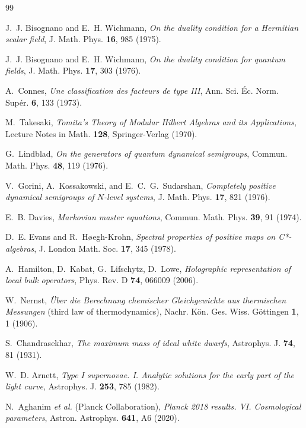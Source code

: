 \documentclass[12pt,a4paper]{article}
\begin{document}
\begin{thebibliography}{99}

J.~J. Bisognano and E.~H. Wichmann,
\textit{On the duality condition for a Hermitian scalar field},
J. Math. Phys. \textbf{16}, 985 (1975).

J.~J. Bisognano and E.~H. Wichmann,
\textit{On the duality condition for quantum fields},
J. Math. Phys. \textbf{17}, 303 (1976).

A.~Connes,
\textit{Une classification des facteurs de type III},
Ann. Sci. \'Ec. Norm. Sup\'er. \textbf{6}, 133 (1973).

M.~Takesaki,
\textit{Tomita's Theory of Modular Hilbert Algebras and its Applications},
Lecture Notes in Math. \textbf{128}, Springer-Verlag (1970).

G.~Lindblad,
\textit{On the generators of quantum dynamical semigroups},
Commun. Math. Phys. \textbf{48}, 119 (1976).

V.~Gorini, A.~Kossakowski, and E.~C.~G.~Sudarshan,
\textit{Completely positive dynamical semigroups of $N$-level systems},
J. Math. Phys. \textbf{17}, 821 (1976).

E.~B. Davies,
\textit{Markovian master equations},
Commun. Math. Phys. \textbf{39}, 91 (1974).

D.~E. Evans and R.~H{\o}egh-Krohn,
\textit{Spectral properties of positive maps on C*-algebras},
J. London Math. Soc. \textbf{17}, 345 (1978).

A.~Hamilton, D.~Kabat, G.~Lifschytz, D.~Lowe,
\textit{Holographic representation of local bulk operators},
Phys. Rev. D \textbf{74}, 066009 (2006).

W.~Nernst,
\textit{\"Uber die Berechnung chemischer Gleichgewichte aus thermischen Messungen}
(third law of thermodynamics),
Nachr. K\"on. Ges. Wiss. G\"ottingen \textbf{1}, 1 (1906).

S.~Chandrasekhar,
\textit{The maximum mass of ideal white dwarfs},
Astrophys. J. \textbf{74}, 81 (1931).

W.~D. Arnett,
\textit{Type I supernovae. I. Analytic solutions for the early part of the light curve},
Astrophys. J. \textbf{253}, 785 (1982).

N.~Aghanim \emph{et al.} (Planck Collaboration),
\textit{Planck 2018 results. VI. Cosmological parameters},
Astron. Astrophys. \textbf{641}, A6 (2020).


\end{thebibliography}
\end{document}
